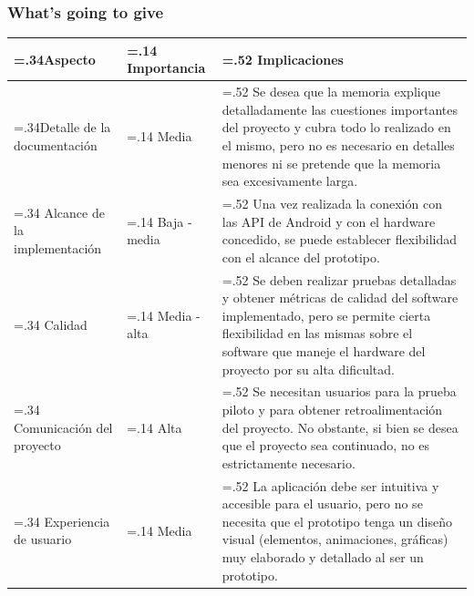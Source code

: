             \subsubsection{What's going to give}
                
                \vspace*{5mm}
                \begin{tabularx}{\textwidth}{ | >{\hsize=.34\hsize}X | >{\hsize=.14\hsize}X | >{\hsize=.52\hsize} X | }
                    \hline
                        Aspecto 
                        & 
                        Importancia  
                        & 
                        Implicaciones \\
                    \hline
                        Detalle de la documentación
                        & 
                        Media  
                        & 
                        Se desea que la memoria explique detalladamente las cuestiones importantes del proyecto y cubra todo lo realizado en el mismo, pero no es necesario en detalles menores ni se pretende que la memoria sea excesivamente larga. \\
                    \hline
                        Alcance de la implementación 
                        & 
                        Baja - media  
                        & 
                        Una vez realizada la conexión con las API de Android y con el hardware concedido, se puede establecer flexibilidad con el alcance del prototipo. \\
                    \hline
                        Calidad 
                        & 
                        Media - alta  
                        & 
                        Se deben realizar pruebas detalladas y obtener métricas de calidad del software implementado, pero se permite cierta flexibilidad en las mismas sobre el software que maneje el hardware del proyecto por su alta dificultad. \\
                    \hline
                        Comunicación del proyecto 
                        & 
                        Alta  
                        & 
                        Se necesitan usuarios para la prueba piloto y para obtener retroalimentación del proyecto. No obstante, si bien se desea que el proyecto sea continuado, no es estrictamente necesario.\\
                    \hline
                        Experiencia de usuario 
                        & 
                        Media  
                        & 
                        La aplicación debe ser intuitiva y accesible para el usuario, pero no se necesita que el prototipo tenga un diseño visual (elementos, animaciones, gráficas) muy elaborado y detallado al ser un prototipo. \\

\end{tabularx}
